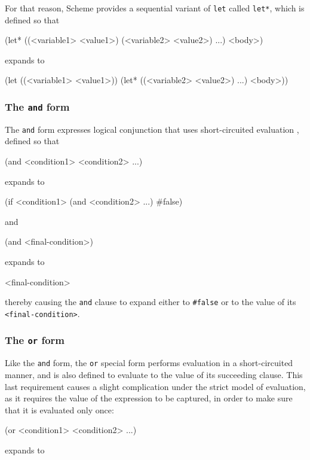 For that reason, Scheme provides a sequential variant of \texttt{let}
called \texttt{let*}, which is defined so that
\begin{Snippet}
(let* ((<variable1> <value1>)
       (<variable2> <value2>)
       ...)
  <body>)
\end{Snippet}
expands to
\begin{Snippet}
(let ((<variable1> <value1>))
  (let* ((<variable2> <value2>)
         ...)
    <body>))
\end{Snippet}

\subsubsection{The \texttt{and} form}

The \texttt{and} form expresses logical conjunction that uses
short-circuited evaluation \cite{McCarthy1960} \cite{Sebesta2008},
defined so that
\begin{Snippet}
(and <condition1> <condition2> ...)
\end{Snippet}
expands to
\begin{Snippet}
(if <condition1>
    (and <condition2> ...)
    #false)
\end{Snippet}
and
\begin{Snippet}
(and <final-condition>)
\end{Snippet}
expands to
\begin{Snippet}
<final-condition>
\end{Snippet}
thereby causing the \texttt{and} clause to expand either to \texttt{\#false}
or to the value of its \texttt{<final-condition>}.

\subsubsection{The \texttt{or} form}

Like the \texttt{and} form, the \texttt{or} special form performs
evaluation in a short-circuited manner, and is also defined to evaluate
to the value of its succeeding clause. This last requirement causes
a slight complication under the strict model of evaluation, as it
requires the value of the expression to be captured, in order to make sure that it
is evaluated only once:

\begin{Snippet}
(or <condition1> <condition2> ...)
\end{Snippet}

expands to 

